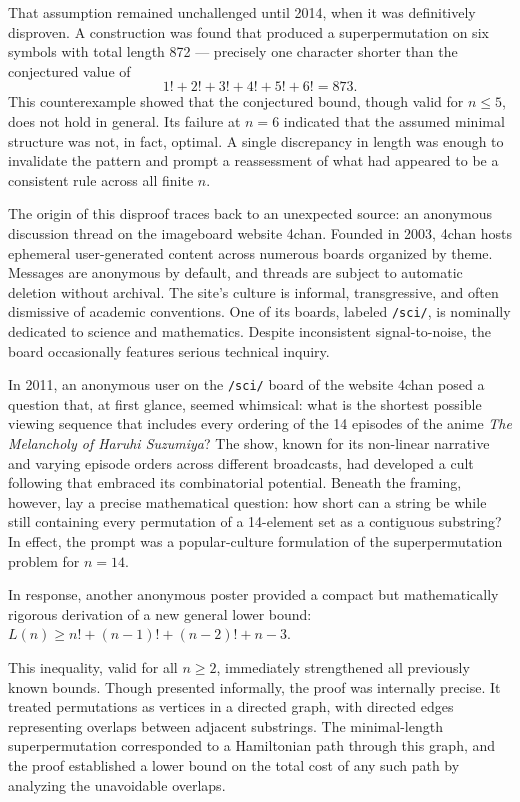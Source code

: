 That assumption remained unchallenged until 2014, when it was definitively disproven. A construction was found that produced a superpermutation on six symbols with total length 872 — precisely one character shorter than the conjectured value of
\[
1! + 2! + 3! + 4! + 5! + 6! = 873.
\]
This counterexample showed that the conjectured bound, though valid for $n \leq 5$, does not hold in general. Its failure at $n = 6$ indicated that the assumed minimal structure was not, in fact, optimal. A single discrepancy in length was enough to invalidate the pattern and prompt a reassessment of what had appeared to be a consistent rule across all finite $n$.

The origin of this disproof traces back to an unexpected source: an anonymous discussion thread on the imageboard website 4chan. Founded in 2003, 4chan hosts ephemeral user-generated content across numerous boards organized by theme. Messages are anonymous by default, and threads are subject to automatic deletion without archival. The site's culture is informal, transgressive, and often dismissive of academic conventions. One of its boards, labeled \texttt{/sci/}, is nominally dedicated to science and mathematics. Despite inconsistent signal-to-noise, the board occasionally features serious technical inquiry.

In 2011, an anonymous user on the \texttt{/sci/} board of the website 4chan posed a question that, at first glance, seemed whimsical: what is the shortest possible viewing sequence that includes every ordering of the 14 episodes of the anime \emph{The Melancholy of Haruhi Suzumiya}? The show, known for its non-linear narrative and varying episode orders across different broadcasts, had developed a cult following that embraced its combinatorial potential. Beneath the framing, however, lay a precise mathematical question: how short can a string be while still containing every permutation of a 14-element set as a contiguous substring? In effect, the prompt was a popular-culture formulation of the superpermutation problem for $n = 14$.

In response, another anonymous poster provided a compact but mathematically rigorous derivation of a new general lower bound: $L(n) \geq n! + (n - 1)! + (n - 2)! + n - 3$. 

This inequality, valid for all $n \geq 2$, immediately strengthened all previously known bounds. Though presented informally, the proof was internally precise. It treated permutations as vertices in a directed graph, with directed edges representing overlaps between adjacent substrings. The minimal-length superpermutation corresponded to a Hamiltonian path through this graph, and the proof established a lower bound on the total cost of any such path by analyzing the unavoidable overlaps.

